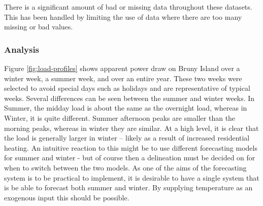 There is a significant amount of bad or missing data throughout these datasets.
This has been handled by limiting the use of data where there are too many missing or bad values.

\subsubsection{Analysis}
Figure \ref{fig:load-profiles} shows apparent power draw on Bruny Island over a winter week, a summer week, and over an entire year.
These two weeks were selected to avoid special days such as holidays and are representative of typical weeks.
Several differences can be seen between the summer and winter weeks.
In Summer, the midday load is about the same as the overnight load, whereas in Winter, it is quite different.
Summer afternoon peaks are smaller than the morning peaks, whereas in winter they are similar.
At a high level, it is clear that the load is generally larger in winter -- likely as a result of increased residential heating.
An intuitive reaction to this might be to use different forecasting models for summer and winter - but of course then a delineation must be decided on for when to switch between the two models.
As one of the aims of the forecasting system is to be practical to implement, it is desirable to have a single system that is be able to forecast both summer and winter.
By supplying temperature as an exogenous input this should be possible.

